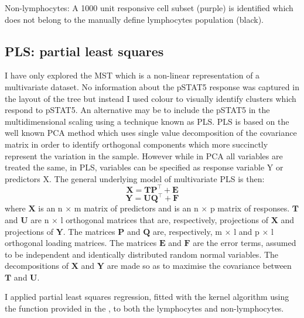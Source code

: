 { Non-lymphocytes: A 1000 unit responsive cell subset (purple) is identified which does not belong to the manually define lymphocytes population (black).  }
{
}


\clearpage


\subsection{PLS: partial least squares}

I have only explored the \gls{MST} which is a non-linear representation of a multivariate dataset.
No information about the pSTAT5 response was captured in the layout of the tree but instead I used
colour to visually identify clusters which respond to pSTAT5.
An alternative may be to include the pSTAT5 in the multidimensional scaling using a technique known
as \acrfull{PLS}.
\gls{PLS} is based on the well known \gls{PCA} method which uses single value decomposition of the covariance matrix
in order to identify orthogonal components which more succinctly represent the variation in the sample.
However while in PCA all variables are treated the same, in PLS, variables can be specified as response variable Y or
predictors X.
The general underlying model of multivariate PLS is then:
\[
    \pmb{X} = \pmb{T} \pmb{P}^{\top} + \pmb{E}
\]
\[
    \pmb{Y} = \pmb{U} \pmb{Q}^{\top} + \pmb{F}
\]
where $\pmb{X}$ is an n $\times$ m matrix of predictors and  is an n $\times$ p matrix of responses.
$\pmb{T}$ and $\pmb{U}$ are n $\times$ l orthogonal matrices that are, respectively, projections of $\pmb{X}$ and projections of $\pmb{Y}$.
The matrices $\pmb{P}$ and $\pmb{Q}$ are, respectively, m $\times$ l and p $\times$ l orthogonal loading matrices.
The matrices $\pmb{E}$ and $\pmb{F}$ are the error terms, assumed to be independent and identically distributed random normal variables.  
The decompositions of $\pmb{X}$ and $\pmb{Y}$ are made so as to maximise the covariance between $\pmb{T}$ and $\pmb{U}$.

I applied partial least squares regression, fitted with the kernel algorithm using the  function provided in the ,
to both the lymphocytes and non-lymphocytes.
%

